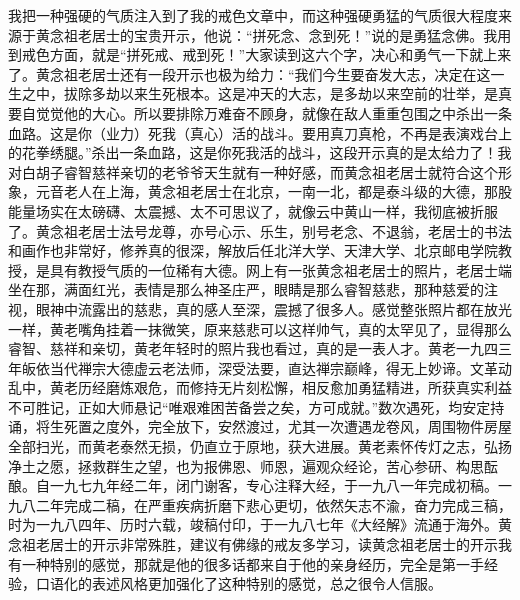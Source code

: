 我把一种强硬的气质注入到了我的戒色文章中，而这种强硬勇猛的气质很大程度来源于黄念祖老居士的宝贵开示，他说：“拼死念、念到死！”说的是勇猛念佛。我用到戒色方面，就是“拼死戒、戒到死！”大家读到这六个字，决心和勇气一下就上来了。黄念祖老居士还有一段开示也极为给力：“我们今生要奋发大志，决定在这一生之中，拔除多劫以来生死根本。这是冲天的大志，是多劫以来空前的壮举，是真要自觉觉他的大心。所以要排除万难奋不顾身，就像在敌人重重包围之中杀出一条血路。这是你（业力）死我（真心）活的战斗。要用真刀真枪，不再是表演戏台上的花拳绣腿。”杀出一条血路，这是你死我活的战斗，这段开示真的是太给力了！我对白胡子睿智慈祥亲切的老爷爷天生就有一种好感，而黄念祖老居士就符合这个形象，元音老人在上海，黄念祖老居士在北京，一南一北，都是泰斗级的大德，那股能量场实在太磅礴、太震撼、太不可思议了，就像云中黄山一样，我彻底被折服了。黄念祖老居士法号龙尊，亦号心示、乐生，别号老念、不退翁，老居士的书法和画作也非常好，修养真的很深，解放后任北洋大学、天津大学、北京邮电学院教授，是具有教授气质的一位稀有大德。网上有一张黄念祖老居士的照片，老居士端坐在那，满面红光，表情是那么神圣庄严，眼睛是那么睿智慈悲，那种慈爱的注视，眼神中流露出的慈悲，真的感人至深，震撼了很多人。感觉整张照片都在放光一样，黄老嘴角挂着一抹微笑，原来慈悲可以这样帅气，真的太罕见了，显得那么睿智、慈祥和亲切，黄老年轻时的照片我也看过，真的是一表人才。黄老一九四三年皈依当代禅宗大德虚云老法师，深受法要，直达禅宗巅峰，得无上妙谛。文革动乱中，黄老历经磨炼艰危，而修持无片刻松懈，相反愈加勇猛精进，所获真实利益不可胜记，正如大师悬记“唯艰难困苦备尝之矣，方可成就。”数次遇死，均安定持诵，将生死置之度外，完全放下，安然渡过，尤其一次遭遇龙卷风，周围物件房屋全部扫光，而黄老泰然无损，仍直立于原地，获大进展。黄老素怀传灯之志，弘扬净土之愿，拯救群生之望，也为报佛恩、师恩，遍观众经论，苦心参研、构思酝酿。自一九七九年经二年，闭门谢客，专心注释大经，于一九八一年完成初稿。一九八二年完成二稿，在严重疾病折磨下悲心更切，依然矢志不渝，奋力完成三稿，时为一九八四年、历时六载，竣稿付印，于一九八七年《大经解》流通于海外。黄念祖老居士的开示非常殊胜，建议有佛缘的戒友多学习，读黄念祖老居士的开示我有一种特别的感觉，那就是他的很多话都来自于他的亲身经历，完全是第一手经验，口语化的表述风格更加强化了这种特别的感觉，总之很令人信服。

